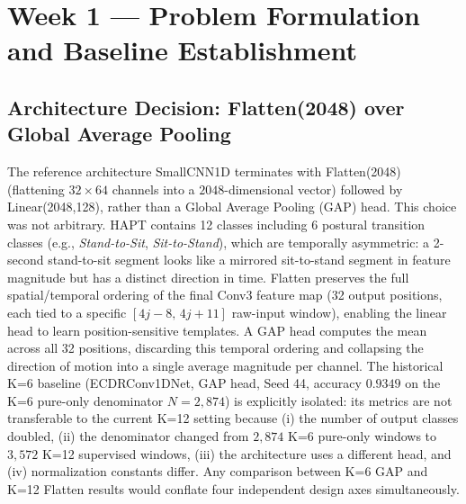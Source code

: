 \documentclass[11pt,oneside,a4paper]{report}
\newcommand{\code}[1]{{\small\upshape\ttfamily #1}}
\theoremstyle{remark}
\begin{document}
\chapter{Week 1 --- Problem Formulation and Baseline Establishment}

\section{Architecture Decision: \code{Flatten(2048)} over Global Average Pooling}
The reference architecture \code{SmallCNN1D} terminates with \code{Flatten(2048)} (flattening $32 \times 64$ channels into a $2048$-dimensional vector) followed by \code{Linear(2048,128)}, rather than a Global Average Pooling (GAP) head. This choice was not arbitrary. HAPT contains 12 classes including 6 postural transition classes (e.g., \textit{Stand-to-Sit}, \textit{Sit-to-Stand}), which are temporally asymmetric: a 2-second stand-to-sit segment looks like a mirrored sit-to-stand segment in feature magnitude but has a distinct direction in time. \code{Flatten} preserves the full spatial/temporal ordering of the final Conv3 feature map (32 output positions, each tied to a specific $[4j{-}8,\,4j{+}11]$ raw-input window), enabling the linear head to learn position-sensitive templates. A GAP head computes the mean across all 32 positions, discarding this temporal ordering and collapsing the direction of motion into a single average magnitude per channel. The historical K=6 baseline (\code{ECDRConv1DNet}, GAP head, Seed 44, accuracy $0.9349$ on the K=6 pure-only denominator $N = 2{,}874$) is explicitly isolated: its metrics are not transferable to the current K=12 setting because (i) the number of output classes doubled, (ii) the denominator changed from $2{,}874$ K=6 pure-only windows to $3{,}572$ K=12 supervised windows, (iii) the architecture uses a different head, and (iv) normalization constants differ. Any comparison between K=6 GAP and K=12 Flatten results would conflate four independent design axes simultaneously.
\end{document}
